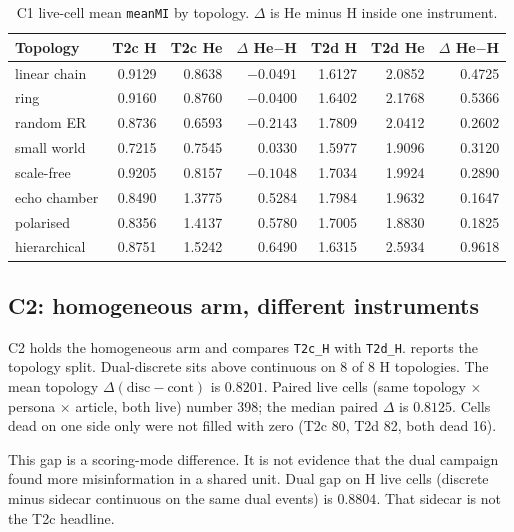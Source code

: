 \begin{table}[t]
\centering
\caption[C1 same-mode topology means]{C1 live-cell mean \texttt{meanMI} by topology.
$\Delta$ is He minus H inside one instrument.}
\label{tab:c1}
\small
\begin{tabular}{lrrrrrr}
\toprule
Topology & T2c H & T2c He & $\Delta$ He$-$H & T2d H & T2d He & $\Delta$ He$-$H \\
\midrule
linear chain & 0.9129 & 0.8638 & $-0.0491$ & 1.6127 & 2.0852 & 0.4725 \\
ring & 0.9160 & 0.8760 & $-0.0400$ & 1.6402 & 2.1768 & 0.5366 \\
random ER & 0.8736 & 0.6593 & $-0.2143$ & 1.7809 & 2.0412 & 0.2602 \\
small world & 0.7215 & 0.7545 & 0.0330 & 1.5977 & 1.9096 & 0.3120 \\
scale-free & 0.9205 & 0.8157 & $-0.1048$ & 1.7034 & 1.9924 & 0.2890 \\
echo chamber & 0.8490 & 1.3775 & 0.5284 & 1.7984 & 1.9632 & 0.1647 \\
polarised & 0.8356 & 1.4137 & 0.5780 & 1.7005 & 1.8830 & 0.1825 \\
hierarchical & 0.8751 & 1.5242 & 0.6490 & 1.6315 & 2.5934 & 0.9618 \\
\bottomrule
\end{tabular}
\end{table}

\subsection{C2: homogeneous arm, different instruments}

C2 holds the homogeneous arm and compares \texttt{T2c\_H} with \texttt{T2d\_H}.
 reports the topology split.
Dual-discrete sits above continuous on 8 of 8 H topologies.
The mean topology $\Delta(\mathrm{disc}-\mathrm{cont})$ is $0.8201$.
Paired live cells (same topology $\times$ persona $\times$ article, both live) number 398; the median paired $\Delta$ is $0.8125$.
Cells dead on one side only were not filled with zero (T2c 80, T2d 82, both dead 16).

This gap is a scoring-mode difference.
It is not evidence that the dual campaign found more misinformation in a shared unit.
Dual gap on H live cells (discrete minus sidecar continuous on the same dual events) is $0.8804$.
That sidecar is not the T2c headline.

